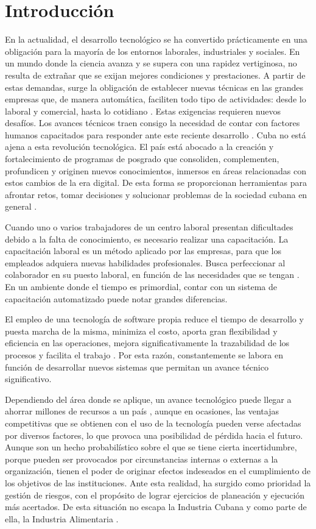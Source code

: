 \chapter*{Introducción}
En la actualidad, el desarrollo tecnológico se ha convertido prácticamente en una obligación para la mayoría de los entornos laborales, industriales y sociales. En un mundo donde la ciencia avanza y se supera con una rapidez vertiginosa, no resulta de extrañar que se exijan mejores condiciones y prestaciones. A partir de estas demandas, surge la obligación de establecer nuevas técnicas en las grandes empresas que, de manera automática, faciliten todo tipo de actividades: desde lo laboral y comercial, hasta lo cotidiano \cite{avanceTecnologico}. 
Estas exigencias requieren nuevos desafíos. Los avances técnicos traen consigo la necesidad de contar con factores humanos capacitados para responder ante este reciente desarrollo \cite{invstCibernCuba}. 
Cuba no está ajena a esta revolución tecnológica. El país está abocado a la creación y fortalecimiento de programas de posgrado que consoliden, complementen, profundicen y originen nuevos conocimientos, inmersos en áreas relacionadas con estos cambios de la era digital. De esta forma se proporcionan herramientas para afrontar retos, tomar decisiones y solucionar problemas de la sociedad cubana en general \cite{avanceTecnologico}.

Cuando uno o varios trabajadores de un centro laboral presentan dificultades debido a la falta de conocimiento, es necesario realizar una capacitación. La capacitación laboral es un método aplicado por las empresas, para que los empleados adquiera nuevas habilidades profesionales. Busca perfeccionar al colaborador en su puesto laboral, en función de las necesidades que se tengan \cite{Denby2010}. En un ambiente donde el tiempo es primordial, contar con un sistema de capacitación automatizado puede notar grandes diferencias.

El empleo de una tecnología de software propia reduce el tiempo de desarrollo y puesta marcha de la misma, minimiza el costo, aporta gran flexibilidad y eficiencia en las operaciones, mejora significativamente la trazabilidad de los procesos y facilita el trabajo \cite{industriaCubana}.
Por esta razón, constantemente se labora en función de desarrollar nuevos sistemas que permitan un avance técnico significativo. 

Dependiendo del área donde se aplique, un avance tecnológico puede llegar a ahorrar millones de recursos a un país \cite{industriaFarmceutica}, aunque en ocasiones, las ventajas competitivas que se obtienen con el uso de la tecnología pueden verse afectadas por diversos factores, lo que provoca una posibilidad de pérdida hacia el futuro. Aunque son un hecho probabilístico sobre el que se tiene cierta incertidumbre, porque pueden ser provocados por circunstancias internas o externas a la organización, tienen el poder de originar efectos indeseados en el cumplimiento de los objetivos de las instituciones. 
Ante esta realidad, ha surgido como prioridad la gestión de riesgos, con el propósito de lograr ejercicios de planeación y ejecución más acertados.
De esta situación no escapa la Industria Cubana y como parte de ella, la Industria Alimentaria \cite{CONVENCION2019}.

